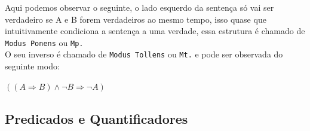 \documentclass[12pt, onecolumn]{article}
\begin{document}
	Aqui podemos observar o seguinte, o lado esquerdo da sentença só 
	vai ser verdadeiro se A e B forem verdadeiros ao mesmo tempo, isso
	quase que intuitivamente condiciona a sentença a uma verdade, essa
	estrutura é chamado de \texttt{Modus Ponens} ou \texttt{Mp.} \\
	\newline
	O seu inverso é chamado de \texttt{Modus Tollens} ou \texttt{Mt.}
	e pode ser observada do seguinte modo: 
	\begin{center}
		$((A \Rightarrow B) \land \lnot{B} \Rightarrow \lnot{A})$
	\end{center}
		\subsection{\centering Predicados e Quantificadores}
	
\end{document}
